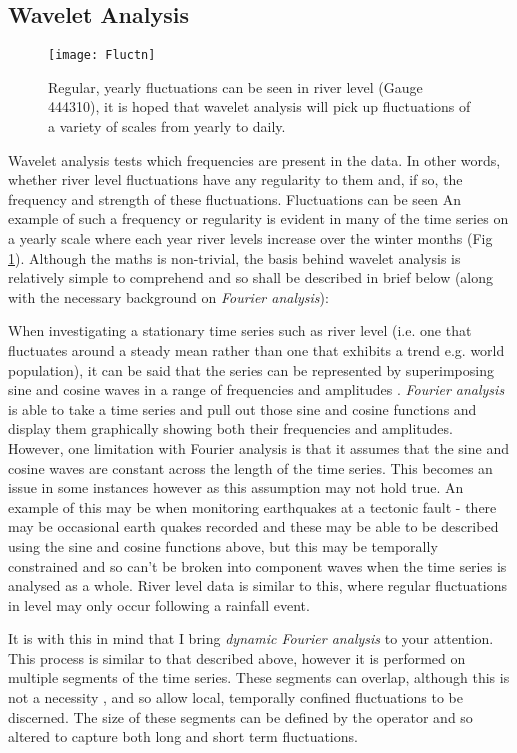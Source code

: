 \documentclass[DIV=calc, paper=a4, fontsize=11pt, twocolumn]{scrartcl}	 %
\begin{document}
	\subsection{Wavelet Analysis}
\begin{figure}[h]
	\texttt{[image: Fluctn]}
	\caption[TOC caption]{Regular, yearly fluctuations can be seen in river level (Gauge 444310), it is hoped that wavelet analysis will pick up fluctuations of a variety of scales from yearly to daily.}
	\label{fig:Fluctn}
	\centering
\end{figure}

Wavelet analysis tests which frequencies are present in the data. In other words, whether river level fluctuations have any regularity to them and, if so, the frequency and strength of these fluctuations. Fluctuations can be seen An example of such a frequency or regularity is evident in many of the time series on a yearly scale where each year river levels increase over the winter months (Fig \ref{fig:Fluctn}). Although the maths is non-trivial, the basis behind wavelet analysis is relatively simple to comprehend and so shall be described in brief below (along with the necessary background on \textit{Fourier analysis}):

When investigating a stationary time series such as river level (i.e. one that fluctuates around a steady mean rather than one that exhibits a trend e.g. world population), it can be said that the series can be represented by superimposing sine and cosine waves in a range of frequencies and amplitudes \citep[p 232]{Shumway2006}. \textit{Fourier analysis} is able to take a time series and pull out those sine and cosine functions and display them graphically showing both their frequencies and amplitudes. However, one limitation with Fourier analysis is that it assumes that the sine and cosine waves are constant across the length of the time series. This becomes an issue in some instances however as this assumption may not hold true. An example of this may be when monitoring earthquakes at a tectonic fault - there may be occasional earth quakes recorded and these may be able to be described using the sine and cosine functions above, but this may be temporally constrained and so can't be broken into component waves when the time series is analysed as a whole. River level data is similar to this, where regular fluctuations in level may only occur following a rainfall event.

It is with this in mind that I bring \textit{dynamic Fourier analysis} to your attention. This process is similar to that described above, however it is performed on multiple segments of the time series. These segments can overlap, although this is not a necessity \citep[p 233]{Shumway2006}, and so allow local, temporally confined fluctuations to be discerned. The size of these segments can be defined by the operator and so altered to capture both long and short term fluctuations. 
\end{document}
